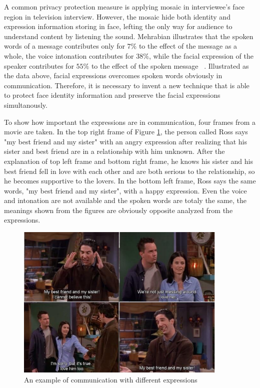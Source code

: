\par
A common privacy protection measure is applying mosaic in interviewee's face region in television interview. 
However, the mosaic hide both identity and expression information storing in face, lefting the only way for audience to understand content by listening the sound. Mehrabian illustrates that the spoken words of a message contributes only for $7\%$ to the effect of the message as a whole, the voice intonation contributes for $38\%$, while the facial expression of the speaker contributes for $55\%$ to the effect of the spoken message ~\cite{Meh68}. Illustrated as the data above, facial expressions overcomes spoken words obviously in communication. Therefore, it is necessary to invent a new technique that is able to protect face identity information and preserve the facial expressions simultanously. 

\par
To show how important the expressions are in communication, four frames from a movie are taken. In the top right frame of Figure \ref{expression}, the person called Ross says "my best friend and my sister" with an angry expression after realizing that his sister and best friend are in a relationship with him unknown. After the explanation of top left frame and bottom right frame, he knows his sister and his best friend fell in love with each other and are both serious to the relationship, so he becomes supportive to the lovers. In the bottom left frame, Ross says the same words, "my best friend and my sister", with a happy expression. Even the voice and intonation are not available and the spoken words are totaly the same, the meanings shown from the figures are obviously opposite analyzed from the expressions. 
\begin{figure}
  \centering
  \includegraphics[width=0.9\textwidth]{figure/sisFri.png} 
  \caption{An example of communication with different expressions}
  \label{expression}
\end{figure}


\par

\par